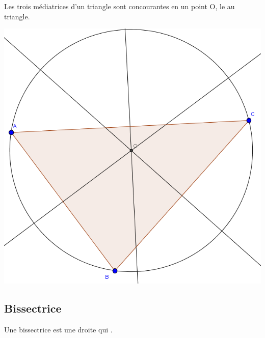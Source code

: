 \documentclass[12pt,a4paper]{article}
\begin{document}
\begin{myprop}
	
	\begin{multicols}{2}
		Les trois médiatrices d'un triangle sont concourantes en un point O, le  au triangle. 
		
		\begin{center}
			\includegraphics[scale=0.35]{./img/mediatrices}
		\end{center} 
				
	\end{multicols}
\end{myprop}



\subsection{Bissectrice}

\begin{mydef}	
	Une bissectrice est une droite qui .
\end{mydef}
\end{document}
